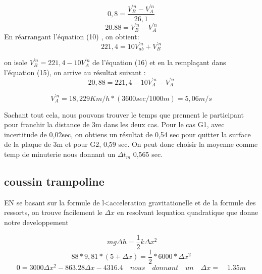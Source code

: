 \documentclass{article}
\begin{document}
 \begin{equation}
 0,8 = \frac{V_{B}^{'n}-V_{A}^{'n}}{26,1}
\end{equation} 
 \begin{equation}
 20.88 = V_{B}^{'n}-V_{A}^{'n} 
\end{equation} 
En réarrangant l'équation (10) , on obtient:
 \begin{equation}
 221,4 = 10V_{ab}^{'n}+V_{B}^{'n}
\end{equation} 

on isole  $V_{B}^{'n} = 221,4 - 10V_{A}^{'n}$ de l'équation (16) et en la remplaçant dans l'équation (15), on arrive au résultat suivant :
\begin{equation}
  20,88 = {221,4 - 10V_{A}^{'n}-V_{A}^{'n}}
\end{equation}

\begin{equation}
  V_{A}^{'n} = 18,229 Km/h *(3600sec/1000m) = 5,06 m/s
\end{equation}
\vspace*{4mm}

Sachant tout cela, nous pouvons trouver le temps que prennent le participant pour franchir la distance de 3m dans les deux cas. Pour le cas G1, avec incertitude de 0,02sec, on obtiens un résultat de 0,54 sec pour quitter la surface de la plaque de 3m et pour G2, 0,59 sec. On peut donc choisir la moyenne comme temp de minuterie nous donnant un $\Delta t_{m}$ 0,565 sec.
 
 
 \subsection{coussin trampoline}
 
 EN se basant sur la formule de l<acceleration gravitationelle et de la formule des ressorts, on trouve facilement le $\Delta x$ en resolvant lequation quadratique que donne notre developpement
 
 \begin{equation}
\ mg \Delta h = \frac{1}{2}k \Delta x ^2
 \end{equation}
 \begin{equation}
 88*9,81*(5+\Delta x) = \frac{1}{2}*6000*\Delta x^2 
 \end{equation}
 \begin{equation}
 0 = 3000\Delta x^2 - 863.28 \Delta x - 4316.4 \quad nous\quad  donnant\quad  un\quad  \Delta x=\quad 1.35m 
 \end{equation}
\end{document}
